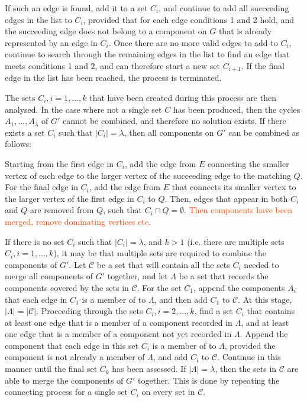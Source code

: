 \documentclass[oribibl]{llncs}
\begin{document}
If such an edge is found, add it to a set $C_i$, and continue to add all succeeding edges in the list to $C_i$, provided that for each edge conditions 1 and 2 hold, and the succeeding edge does not belong to a component on $G$ that is already represented by an edge in $C_i$. Once there are no more valid edges to add to $C_i$, continue to search through the remaining edges in the list to find an edge that meets conditions 1 and 2, and can therefore start a new set $C_{i+1}$. If the final edge in the list has been reached, the process is terminated.

The sets $C_i, i = 1, ..., k$ that have been created during this process are then analysed. In the case where not a single set $C$ has been produced, then the cycles $A_1,..., A_{\lambda}$ of $G'$ cannot be combined, and therefore no solution exists. If there exists a set $C_i$ such that $|C_i| = \lambda$, then all components on $G'$ can be combined as follows:

Starting from the first edge in $C_i$, add the edge from $E$ connecting the smaller vertex of each edge to the larger vertex of the succeeding edge to the matching $Q$. For the final edge in $C_i$, add the edge from $E$ that connects its smaller vertex to the larger vertex of the first edge in $C_i$ to $Q$. Then, edges that appear in both $C_i$ and $Q$ are removed from $Q$, such that $C_i \cap Q = \emptyset$. \textcolor{OrangeRed}{Then components have been merged, remove dominating vertices etc}.


If there is no set $C_i$ such that $|C_i| = \lambda$, and $k > 1$ (i.e. there are multiple sets $C_i, i = 1,..., k$), it may be that multiple sets are required to combine the components of $G'$. Let $\mathcal{C}$ be a set that will contain all the sets $C_i$ needed to merge all components of $G'$ together, and let $\Lambda$ be a set that records the components covered by the sets in $\mathcal{C}$. For the set $C_1$, append the components $A_i$ that each edge in $C_1$ is a member of to $\Lambda$, and then add $C_1$ to $\mathcal{C}$. At this stage, $|\Lambda| = |\mathcal{C}|$. Proceeding through the sets $C_i, i = 2, ..., k$, find a set $C_i$ that contains at least one edge that is a member of a component recorded in $\Lambda$, and at least one edge that is a member of a component not yet recorded in $\Lambda$. Append the component that each edge in this set $C_i$ is a member of to $\Lambda$, provided the component is not already a member of $\Lambda$, and add $C_i$ to $\mathcal{C}$. Continue in this manner until the final set $C_k$ has been assessed. If $|\Lambda| = \lambda$, then the sets in $\mathcal{C}$ are able to merge the components of $G'$ together. This is done by repeating the connecting process for a single set $C_i$ on every set in $\mathcal{C}$. 
\end{document}
